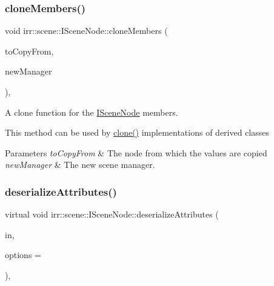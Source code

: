 \subsubsection{\texorpdfstring{clone\+Members()}{cloneMembers()}\hspace{0.1cm}{\footnotesize\ttfamily [2/2]}}
{\footnotesize\ttfamily void irr\+::scene\+::\+I\+Scene\+Node\+::clone\+Members (\begin{DoxyParamCaption}\item[{\hyperlink{classirr_1_1scene_1_1ISceneNode}{I\+Scene\+Node} $\ast$}]{to\+Copy\+From,  }\item[{\hyperlink{classirr_1_1scene_1_1ISceneManager}{I\+Scene\+Manager} $\ast$}]{new\+Manager }\end{DoxyParamCaption})\hspace{0.3cm}{\ttfamily [inline]}, {\ttfamily [protected]}}



A clone function for the \hyperlink{classirr_1_1scene_1_1ISceneNode}{I\+Scene\+Node} members. 

This method can be used by \hyperlink{classirr_1_1scene_1_1ISceneNode_ac39832b55855dc59196053adbaec95cc}{clone()} implementations of derived classes 
\begin{DoxyParams}{Parameters}
{\em to\+Copy\+From} & The node from which the values are copied \\
\hline
{\em new\+Manager} & The new scene manager. \\
\hline
\end{DoxyParams}
\mbox{\label{classirr_1_1scene_1_1ISceneNode_a5fb609b08fc89a92f928c19ce3b181eb}} 
\subsubsection{\texorpdfstring{deserialize\+Attributes()}{deserializeAttributes()}\hspace{0.1cm}{\footnotesize\ttfamily [1/2]}}
{\footnotesize\ttfamily virtual void irr\+::scene\+::\+I\+Scene\+Node\+::deserialize\+Attributes (\begin{DoxyParamCaption}\item[{\hyperlink{classirr_1_1io_1_1IAttributes}{io\+::\+I\+Attributes} $\ast$}]{in,  }\item[{\hyperlink{structirr_1_1io_1_1SAttributeReadWriteOptions}{io\+::\+S\+Attribute\+Read\+Write\+Options} $\ast$}]{options = {} }\end{DoxyParamCaption})\hspace{0.3cm}{\ttfamily [inline]}, {\ttfamily [virtual]}}



